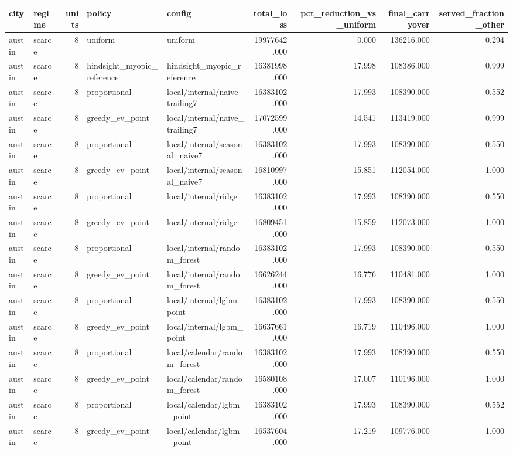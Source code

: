 \begin{tabular}{llrllrrrr}
\toprule
city & regime & units & policy & config & total\_loss & pct\_reduction\_vs\_uniform & final\_carryover & served\_fraction\_other \\
\midrule
austin & scarce & 8 & uniform & uniform & 19977642.000 & 0.000 & 136216.000 & 0.294 \\
austin & scarce & 8 & hindsight\_myopic\_reference & hindsight\_myopic\_reference & 16381998.000 & 17.998 & 108386.000 & 0.999 \\
austin & scarce & 8 & proportional & local/internal/naive\_trailing7 & 16383102.000 & 17.993 & 108390.000 & 0.552 \\
austin & scarce & 8 & greedy\_ev\_point & local/internal/naive\_trailing7 & 17072599.000 & 14.541 & 113419.000 & 0.999 \\
austin & scarce & 8 & proportional & local/internal/seasonal\_naive7 & 16383102.000 & 17.993 & 108390.000 & 0.550 \\
austin & scarce & 8 & greedy\_ev\_point & local/internal/seasonal\_naive7 & 16810997.000 & 15.851 & 112054.000 & 1.000 \\
austin & scarce & 8 & proportional & local/internal/ridge & 16383102.000 & 17.993 & 108390.000 & 0.550 \\
austin & scarce & 8 & greedy\_ev\_point & local/internal/ridge & 16809451.000 & 15.859 & 112073.000 & 1.000 \\
austin & scarce & 8 & proportional & local/internal/random\_forest & 16383102.000 & 17.993 & 108390.000 & 0.550 \\
austin & scarce & 8 & greedy\_ev\_point & local/internal/random\_forest & 16626244.000 & 16.776 & 110481.000 & 1.000 \\
austin & scarce & 8 & proportional & local/internal/lgbm\_point & 16383102.000 & 17.993 & 108390.000 & 0.550 \\
austin & scarce & 8 & greedy\_ev\_point & local/internal/lgbm\_point & 16637661.000 & 16.719 & 110496.000 & 1.000 \\
austin & scarce & 8 & proportional & local/calendar/random\_forest & 16383102.000 & 17.993 & 108390.000 & 0.550 \\
austin & scarce & 8 & greedy\_ev\_point & local/calendar/random\_forest & 16580108.000 & 17.007 & 110196.000 & 1.000 \\
austin & scarce & 8 & proportional & local/calendar/lgbm\_point & 16383102.000 & 17.993 & 108390.000 & 0.552 \\
austin & scarce & 8 & greedy\_ev\_point & local/calendar/lgbm\_point & 16537604.000 & 17.219 & 109776.000 & 1.000 \\

\end{tabular}

